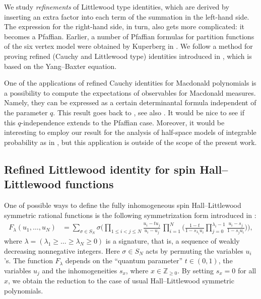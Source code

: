 We study \emph{refinements} of Littlewood type identities,
which are derived by inserting an extra factor
into each term of the summation in the left-hand side.
The expression for the right-hand side, in turn, also gets more complicated: it becomes a Pfaffian. Earlier, a number of Pfaffian formulas for partition functions of the six vertex model were obtained by Kuperberg in \cite{Kup02}. We follow a method for proving refined (Cauchy and Littlewood type) identities introduced in \cite{WZJ16}, which is based on the Yang--Baxter equation.

One of the applications of refined Cauchy identities for Macdonald polynomials is a possibility to compute the expectations of observables for Macdonald
measures. Namely, they can be expressed as a certain determinantal formula independent of the parameter $q$.
This result goes back to 
\cite{KN99}, see also \cite{War08,Bor18,Pet21}.
It would be nice to see if this $q$-independence extends to the Pfaffian case. Moreover, it would be interesting to employ our result for the analysis of half-space models of integrable probability as in \cite{BBC20,BBCW18,BZ19}, but this application is outside of the scope of the present work.

\subsection{Refined Littlewood identity for spin Hall--Littlewood functions}

One of possible ways to define the fully inhomogeneous 
spin Hall--Littlewood 
symmetric rational functions is the following
symmetrization form introduced in \cite{BP18}:
\begin{equation*}
\begin{split}
F_\lambda(u_1,\ldots,u_N )
&=
\sum_{\sigma\in S_N}
\sigma
\Biggl( 
\prod_{1\le i<j\le N}\frac{u_i-t u_j}{u_i-u_j}\,
\prod_{i=1}^{N}
\biggl(
\frac{1-t}{1-s_{\lambda_i}u_i}
\prod_{j=0}^{\lambda_i-1}\frac{ u_i-s_j}{1- s_j u_i}
\biggr)
\Biggr),
\end{split}
\end{equation*}
where 
$\lambda=(\lambda_1\ge\ldots\ge \lambda_N\ge0 )$ is a signature, that is, a sequence of weakly decreasing nonnegative integers.
Here $\sigma\in S_N$
acts by permuting the variables $u_i$'s.
The function $F_\lambda$ depends on the ``quantum parameter''
$t \in (0, 1)$, the variables $u_j$ and the inhomogeneities $s_x$, where $x\in \mathbb{Z}_{\ge0}$.
By setting $s_x=0$ for all $x$, we obtain the reduction to the case of usual
Hall--Littlewood symmetric polynomials.

